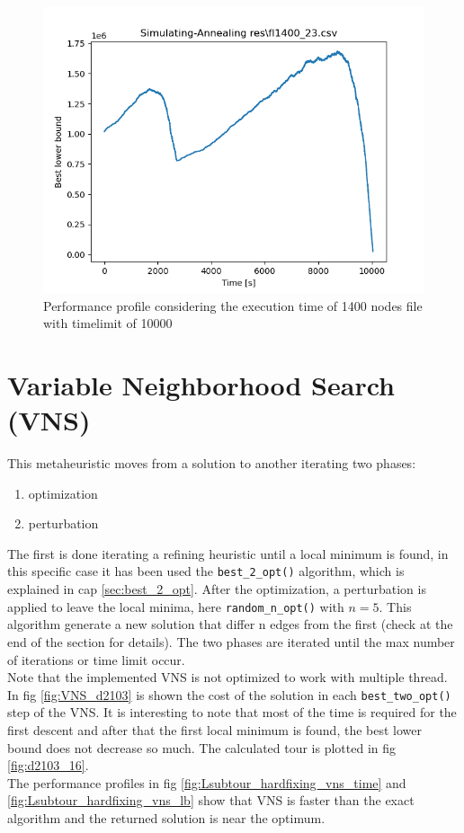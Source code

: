 \begin{figure}[h]
	\centering
	\includegraphics[width=1.0\columnwidth]{../res/fl1400_23.png}
	\caption{Performance profile considering the execution time of 1400 nodes file with timelimit of 10000}
	\label{fig:simultaing_annealing_perform_time}
\end{figure}

\section{Variable Neighborhood Search (VNS)}
This metaheuristic moves from a solution to another iterating two phases:
\begin{enumerate}
	\item optimization
	\item perturbation
\end{enumerate}
The first is done iterating a refining heuristic until a local minimum is found, in this specific case it has been used the \texttt{best\_2\_opt()} algorithm, which is explained in cap \ref{sec:best_2_opt}. After the optimization, a perturbation is applied to leave the local minima, here \texttt{random\_n\_opt()} with $ n=5 $. This algorithm generate a new solution that differ n edges from the first (check at the end of the section for details).
The two phases are iterated until the max number of iterations or time limit occur.\\
Note that the implemented VNS is not optimized to work with multiple thread.\\
In fig \ref{fig:VNS_d2103} is shown the cost of the solution in each \texttt{best\_two\_opt()} step of the VNS. It is interesting to note that most of the time is required for the first descent and after that the first local minimum is found, the best lower bound does not decrease so much.
The calculated tour is plotted in fig \ref{fig:d2103_16}.\\
The performance profiles in fig \ref{fig:Lsubtour_hardfixing_vns_time} and \ref{fig:Lsubtour_hardfixing_vns_lb} show that VNS is faster than the exact algorithm and the returned solution is near the optimum.

